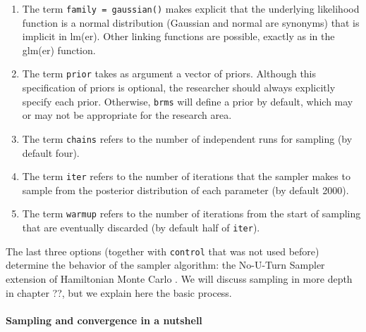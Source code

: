 \documentclass[12pt,]{krantz}
\providecommand{\tightlist}{%
  \setlength{\itemsep}{0pt}\setlength{\parskip}{0pt}}
\let\oldparagraph\paragraph
\renewcommand{\paragraph}[1]{\oldparagraph{#1}\mbox{}}
\theoremstyle{definition}
\theoremstyle{definition}
\theoremstyle{definition}
\theoremstyle{remark}
\begin{document}
\begin{enumerate}
\def\labelenumi{\arabic{enumi}.}
\tightlist
\item
  The term \texttt{family\ =\ gaussian()} makes explicit that the underlying likelihood function is a normal distribution (Gaussian and normal are synonyms) that is implicit in lm(er). Other linking functions are possible, exactly as in the glm(er) function.
\item
  The term \texttt{prior} takes as argument a vector of priors. Although this specification of priors is optional, the researcher should always explicitly specify each prior. Otherwise, \texttt{brms} will define a prior by default, which may or may not be appropriate for the research area.
\item
  The term \texttt{chains} refers to the number of independent runs for sampling (by default four).
\item
  The term \texttt{iter} refers to the number of iterations that the sampler makes to sample from the posterior distribution of each parameter (by default 2000).
\item
  The term \texttt{warmup} refers to the number of iterations from the start of sampling that are eventually discarded (by default half of \texttt{iter}).
\end{enumerate}

The last three options (together with \texttt{control} that was not used before) determine the behavior of the sampler algorithm: the No-U-Turn Sampler \citep[NUTS;][]{hoffmanNoUTurnSamplerAdaptively2014} extension of Hamiltonian Monte Carlo \citep{duaneHybridMonteCarlo1987, nealMCMCUsingHamiltonian2011}. We will discuss sampling in more depth in chapter ??, but we explain here the basic process.

\hypertarget{sec:convergencenut}{%
\paragraph{Sampling and convergence in a nutshell}\label{sec:convergencenut}}
\end{document}
